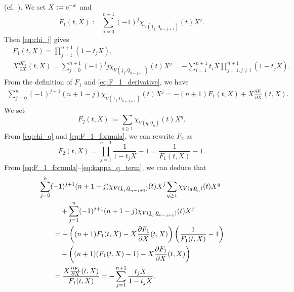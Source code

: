 \documentclass[pdftex]{sigma}
\numberwithin{equation}{section}
\begin{document}
(cf.~\cite[equations (6.1) and (6.2)]{Fulton-Harris-04}).
We set $X := {\rm e}^{-x}$
and
\[
 F_1 ( t , X)
 :=
 \sum_{j=0}^{n+1}
 (-1)^j
 \chi_{V ( \underline{1}_{j} ,\underline{0}_{n-j+1} )} ( t )
 X^j
 .
\]
Then \eqref{eq:chi_j} gives
\begin{align}
& F_1 ( t ,X)
 =
 \prod_{j=1}^{n+1}
 (1 - t_j X)
 ,
 \label{eq:F_1_formula}
 \\
& X \frac{\partial F_1}{\partial X} ( t , X)
 =
 \sum_{j=0}^{n+1}
 (-1)^j
 j
 \chi_{V ( \underline{1}_{j} ,\underline{0}_{n-j+1} )} ( t )
 X^j
 =
 -
 \sum_{i=1}^{n+1}
 t_i X
 \prod_{j=1, j \not = i }^{n+1}
 (1 - t_j X)
 .
 \label{eq:F_1_derivative}
\end{align}
From the definition of $F_1$ and \eqref{eq:F_1_derivative},
we have
\begin{align}
 \sum_{j=0}^{n}
 (-1 )^{j+1} (n+1-j)
 \chi_{V ( \underline{1}_{j} ,\underline{0}_{n-j+1} )} ( t )
 X^j
 =
 - (n+1 ) F_1 ( t , X )
 + X \frac{\partial F_1 }{\partial X} ( t , X )
 .
 \label{eq:kappa_j_term}
\end{align}
%
We set
\[
 F_2 ( t ,X )
 :=
 \sum_{q \geq 1 }
 \chi_{V ( q, \underline{0}_{n} )} ( t ) X^q .
\]
From \eqref{eq:chi_q} and \eqref{eq:F_1_formula},
we can rewrite $F_2$ as
\begin{equation}
 F_2 ( t , X)
 =
 \prod_{j=1}^{n+1}
 \frac{1}{1 - t_j X} -1
 =
 \frac{1}{F_1 ( t , X)} -1
 .
 \label{eq:kappa_q_term}
\end{equation}
From \eqref{eq:F_1_formula}--\eqref{eq:kappa_q_term},
we can deduce that
\begin{align}
 &
 \sum_{j=0}^{n}
 (-1 )^{j+1} (n+1-j)
 \chi_{V ( \underline{1}_{j} ,\underline{0}_{n-j+1} )} ( t )
 X^j
 \sum_{q \geq 1 }
 \chi_{V ( q, \underline{0}_{n} )} ( t ) X^q
 \notag
 \\
 &
 \qquad \quad{}+
 \sum_{j=1}^{n}
 (-1 )^{j+1} (n+1-j)
 \chi_{V ( \underline{1}_{j} ,\underline{0}_{n-j+1} )} ( t )
 X^j
 \notag
 \\
 & \qquad{}=
 -
 \left(
 (n+1) F_1 ( t,X) - X \frac{\partial F_1}{\partial X} ( t , X )
 \right)
 \left(
 \frac{1}{F_1 ( t , X ) } -1
 \right)
 \notag
 \\
 & \qquad \quad{}
 -
 \left(
 (n+1)( F_1 ( t , X ) -1 )
 - X \frac{\partial F_1}{\partial X} ( t , X )
 \right)
 \notag \\
 & \qquad{}=
 \frac{X \frac{\partial F_1}{\partial X} ( t , X )}{F_1 ( t , X )}
 =
 -
 \sum_{j=1}^{n+1} \frac{t_j X}{1 - t_j X }
 .
 \label{eq:kappa_contents_of_inte}
\end{align}
\end{document}
